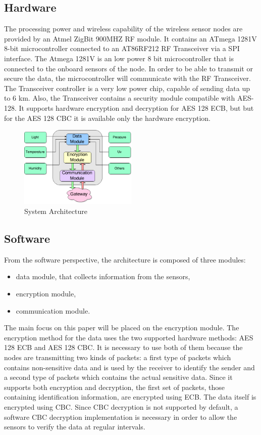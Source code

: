 \label{chap:arch}
\subsection{Hardware}

The processing power and wireless capability of the wireless sensor nodes are provided by an Atmel
ZigBit 900MHZ RF module. It contains an ATmega 1281V 8-bit microcontroller connected to an
AT86RF212 RF Transceiver via a SPI interface. The Atmega 1281V is an low power 8 bit microcontroller
that is connected to the onboard sensors of the node. In order to be able to transmit or secure the
data, the microcontroller will communicate with the RF Transceiver. The Transceiver controller is a very low power chip,
capable of sending data up to 6 km. Also, the Transceiver contains a security module compatible
with AES-128. It supports hardware encryption and decryption for AES 128 ECB, but but for the AES
128 CBC it is available only the hardware encryption.


\begin{figure}[ht] \centering
  \includegraphics[width=0.5\textwidth]{img/wsn-soa-system-arch.png}
  \caption{System Architecture}
\end{figure}

\subsection{Software}

From the software perspective, the architecture is composed of three modules:
\begin{itemize}
\item data module, that
collects information from the sensors,
\item encryption module,
\item communication module.
\end{itemize}

The main focus on this paper will be placed on the encryption module.
The encryption method for the data uses the two supported hardware methods: AES 128 ECB
and AES 128 CBC. It is necessary to use both of them because the nodes are transmitting 
two kinds of packets: a first type of packets which contains non-sensitive data and is used by the
receiver to identify the sender and a second type of packets which contains the actual sensitive data. Since it supports 
both encryption and decryption, the first set of packets, those containing identification
information, are encrypted using ECB. The data itself is encrypted using CBC. Since CBC 
decryption is not supported by default, a software CBC decryption implementation is necessary in order to allow the sensors to verify the data at regular intervals.

